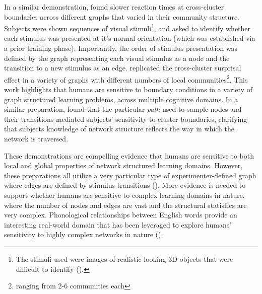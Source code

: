 \documentclass[12pt]{article}
\let\oldcite=\cite
\let\oldtextcite=\textcite
\renewcommand{\cite}[1]{\textcolor[rgb]{0, .121, .388}{\oldcite{#1}}}
\renewcommand{\textcite}[1]{\textcolor[rgb]{0, .121, .388}{\oldtextcite{#1}}}
\begin{document}
In a similar demonstration, \textcite{karuza2019human} found slower reaction times at cross-cluster boundaries across different graphs that varied in their community structure. Subjects were shown sequences of visual stimuli\footnote{ The stimuli used were images of realistic looking 3D objects that were difficult to identify (\cite{horst2016novel}).}, and asked to identify whether each stimulus was presented at it's normal orientation (which was established via a prior training phase). Importantly, the order of stimulus presentation was defined by the graph representing each visual stimulus as a node and the transition to a new stimulus as an edge. \textcite{karuza2019human} replicated the cross-cluster surprisal effect in a variety of graphs with different numbers of local communities\footnote{ ranging from 2-6 communities each}. This work highlights that humans are sensitive to boundary conditions in a variety of graph structured learning problems, across multiple cognitive domains. In a similar preparation, \textcite{karuza2017process} found that the particular \emph{path} used to sample nodes and their transitions mediated subjects' sensitivity to cluster boundaries, clarifying that subjects knowledge of network structure reflects the way in which the network is traversed. 

These demonstrations are compelling evidence that humans are sensitive to both local and global properties of network structured learning domains. However, these preparations all utilize a very particular type of experimenter-defined graph where edges are defined by stimulus transitions (\cite{kahn2018network,karuza2017process,karuza2019human}). More evidence is needed to support whether humans are sensitive to complex learning domains in nature, where the number of nodes and edges are vast and the structural statistics are very complex. Phonological relationships between English words provide an interesting real-world domain that has been leveraged to explore humans' sensitivity to highly complex networks in nature (\cite{vitevitch2008can,vitevitch2012complex,chan2009influence,chan2010network}).
\end{document}
